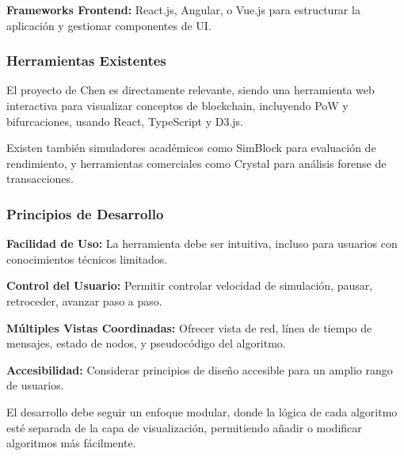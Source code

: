 \documentclass[spanish,12pt,letterpaper]{report}
\begin{document}
\textbf{Frameworks Frontend:} React.js, Angular, o Vue.js para estructurar la aplicación y gestionar componentes de UI.

\subsubsection{Herramientas Existentes}

El proyecto de Chen \parencite{chen2024blockchain} es directamente relevante, siendo una herramienta web interactiva para visualizar conceptos de blockchain, incluyendo PoW y bifurcaciones, usando React, TypeScript y D3.js.

Existen también simuladores académicos como SimBlock para evaluación de rendimiento, y herramientas comerciales como Crystal para análisis forense de transacciones.

\subsubsection{Principios de Desarrollo}

\textbf{Facilidad de Uso:} La herramienta debe ser intuitiva, incluso para usuarios con conocimientos técnicos limitados.

\textbf{Control del Usuario:} Permitir controlar velocidad de simulación, pausar, retroceder, avanzar paso a paso.

\textbf{Múltiples Vistas Coordinadas:} Ofrecer vista de red, línea de tiempo de mensajes, estado de nodos, y pseudocódigo del algoritmo.

\textbf{Accesibilidad:} Considerar principios de diseño accesible para un amplio rango de usuarios.

El desarrollo debe seguir un enfoque modular, donde la lógica de cada algoritmo esté separada de la capa de visualización, permitiendo añadir o modificar algoritmos más fácilmente.


\printbibliography
\end{document}
